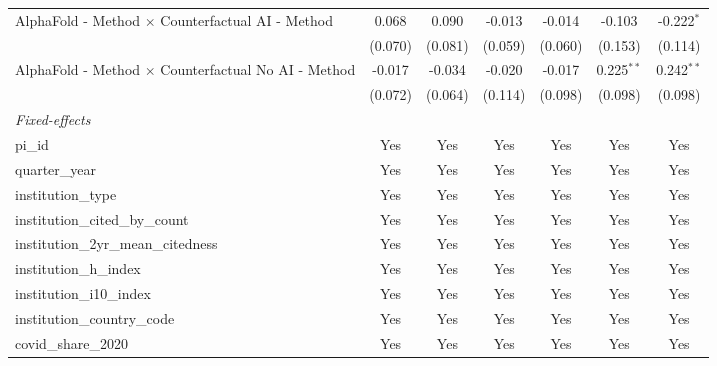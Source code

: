 \begin{tabular}{lcccccc}
   AlphaFold - Method $\times$ Counterfactual AI - Method      & 0.068         & 0.090         & -0.013        & -0.014        & -0.103        & -0.222$^{*}$\\   
                                                               & (0.070)       & (0.081)       & (0.059)       & (0.060)       & (0.153)       & (0.114)\\   
   AlphaFold - Method $\times$ Counterfactual No AI - Method   & -0.017        & -0.034        & -0.020        & -0.017        & 0.225$^{**}$  & 0.242$^{**}$\\   
                                                               & (0.072)       & (0.064)       & (0.114)       & (0.098)       & (0.098)       & (0.098)\\   
   \midrule
   \emph{Fixed-effects}\\
   pi\_id                                                      & Yes           & Yes           & Yes           & Yes           & Yes           & Yes\\  
   quarter\_year                                               & Yes           & Yes           & Yes           & Yes           & Yes           & Yes\\  
   institution\_type                                           & Yes           & Yes           & Yes           & Yes           & Yes           & Yes\\  
   institution\_cited\_by\_count                               & Yes           & Yes           & Yes           & Yes           & Yes           & Yes\\  
   institution\_2yr\_mean\_citedness                           & Yes           & Yes           & Yes           & Yes           & Yes           & Yes\\  
   institution\_h\_index                                       & Yes           & Yes           & Yes           & Yes           & Yes           & Yes\\  
   institution\_i10\_index                                     & Yes           & Yes           & Yes           & Yes           & Yes           & Yes\\  
   institution\_country\_code                                  & Yes           & Yes           & Yes           & Yes           & Yes           & Yes\\  
   covid\_share\_2020                                          & Yes           & Yes           & Yes           & Yes           & Yes           & Yes\\  

\end{tabular}
